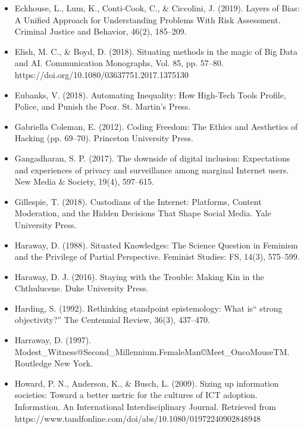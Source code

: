 \documentclass[a4paper,man,natbib]{apa6}
\begin{document}
\begin{itemize}[label={},itemindent=-2em,leftmargin=2em]
   \item Eckhouse, L., Lum, K., Conti-Cook, C., \& Ciccolini, J. (2019). Layers of Bias: A Unified Approach for Understanding Problems With Risk Assessment. Criminal Justice and Behavior, 46(2), 185–209.

   \item Elish, M. C., \& Boyd, D. (2018). Situating methods in the magic of Big Data and AI. Communication Monographs, Vol. 85, pp. 57–80. https://doi.org/10.1080/03637751.2017.1375130

   \item Eubanks, V. (2018). Automating Inequality: How High-Tech Tools Profile, Police, and Punish the Poor. St. Martin’s Press.

   \item Gabriella Coleman, E. (2012). Coding Freedom: The Ethics and Aesthetics of Hacking (pp. 69–70). Princeton University Press.

   \item Gangadharan, S. P. (2017). The downside of digital inclusion: Expectations and experiences of privacy and surveillance among marginal Internet users. New Media \& Society, 19(4), 597–615.

   \item Gillespie, T. (2018). Custodians of the Internet: Platforms, Content Moderation, and the Hidden Decisions That Shape Social Media. Yale University Press.

   \item Haraway, D. (1988). Situated Knowledges: The Science Question in Feminism and the Privilege of Partial Perspective. Feminist Studies: FS, 14(3), 575–599.

   \item Haraway, D. J. (2016). Staying with the Trouble: Making Kin in the Chthulucene. Duke University Press.

   \item Harding, S. (1992). Rethinking standpoint epistemology: What is“ strong objectivity?” The Centennial Review, 36(3), 437–470.

   \item Harraway, D. (1997). Modest\_Witness@Second\_Millennium.FemaleMan©Meet\_OncoMouseTM. Routledge New York.

   \item Howard, P. N., Anderson, K., \& Busch, L. (2009). Sizing up information societies: Toward a better metric for the cultures of ICT adoption. Information. An International Interdisciplinary Journal. Retrieved from https://www.tandfonline.com/doi/abs/10.1080/01972240902848948


\end{itemize}
\end{document}
